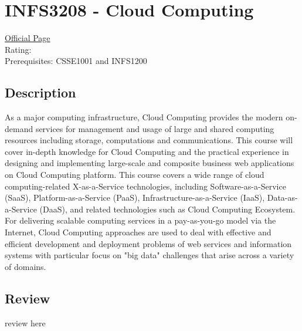 \hypertarget{INFS3208}{\section{INFS3208 - Cloud Computing}}

\large
\textcolor{turbo_purple}{\href{https://my.uq.edu.au/programs-courses/course.html?course_code=INFS3208}{Official Page}} \\
Rating: \cstar\cstar\cstar\cstar\ostar \\
Prerequisites: CSSE1001 and INFS1200

\normalsize
\subsection*{Description}
As a major computing infrastructure, Cloud Computing provides the modern on-demand services for management and usage of large and shared computing resources including storage, computations and communications.
This course will cover in-depth knowledge for Cloud Computing and the practical experience in designing and implementing large-scale and composite business web applications on Cloud Computing platform.
This course covers a wide range of cloud computing-related X-as-a-Service technologies, including Software-as-a-Service (SaaS), Platform-as-a-Service (PaaS), Infrastructure-as-a-Service (IaaS), Data-as-a-Service (DaaS), and related technologies such as Cloud Computing Ecosystem.
For delivering scalable computing services in a pay-as-you-go model via the Internet, Cloud Computing approaches are used to deal with effective and efficient development and deployment problems of web services and information systems with particular focus on "big data" challenges that arise across a variety of domains.

\subsection*{Review}
review here
